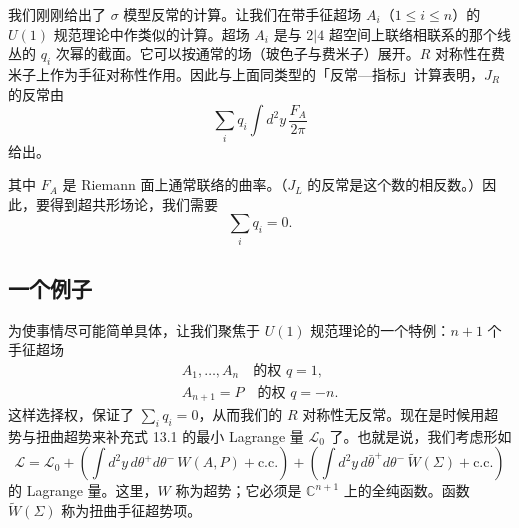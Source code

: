 我们刚刚给出了 $\sigma$ 模型反常的计算。让我们在带手征超场 $A_i$（$1\le i\le n$）的 $U(1)$ 规范理论中作类似的计算。超场 $A_i$ 是与 $2|4$ 超空间上联络相联系的那个线丛的 $q_i$ 次幂的截面。它可以按通常的场（玻色子与费米子）展开。$R$ 对称性在费米子上作为手征对称性作用。因此与上面同类型的「反常—指标」计算表明，$J_R$ 的反常由
\[
\sum_i q_i\int d^2y\,\frac{F_A}{2\pi}
\]
给出。


其中 $F_A$ 是 Riemann 面上通常联络的曲率。（$J_L$ 的反常是这个数的相反数。）因此，要得到超共形场论，我们需要
\[
\sum_i q_i=0.
\]

\subsection{一个例子}

为使事情尽可能简单具体，让我们聚焦于 $U(1)$ 规范理论的一个特例：$n+1$ 个手征超场
\[
\begin{gathered}
A_1,\dots,A_n\quad\text{的权 }q=1,\\
A_{n+1}=P\quad\text{的权 }q=-n.
\end{gathered}
\]
这样选择权，保证了 $\sum_iq_i=0$，从而我们的 $R$ 对称性无反常。现在是时候用超势与扭曲超势来补充式 13.1 的最小 Lagrange 量 $\mathcal{L}_0$ 了。也就是说，我们考虑形如
\begin{equation}
  \tag{13.2}
  \label{eq:13-2}
  \mathcal{L}=\mathcal{L}_0+\left(\int d^2y\,d\theta^+d\theta^-\,W(A,P)+\text{c.c.}\right)+\left(\int d^2y\,d\bar\theta^+d\theta^-\,\widetilde W(\Sigma)+\text{c.c.}\right)
\end{equation}
的 Lagrange 量。这里，$W$ 称为超势；它必须是 $\mathbb{C}^{n+1}$ 上的全纯函数。函数 $\widetilde W(\Sigma)$ 称为扭曲手征超势项。

